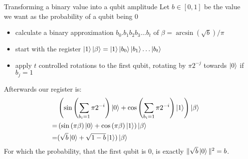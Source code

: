 \documentclass{beamer}
\begin{document}
\frame{\titlepage}










\appendix
\nocite{*}
\frame[allowframebreaks]{\printbibliography}

\begin{frame}{Transforming a binary value into a qubit amplitude}
Let $b\in [0,1]$ be the value we want as the probability of a qubit being 0
\begin{itemize}
\item calculate a binary approximation $b_0.b_1b_2b_3\ldots b_t$ of $\beta=\arcsin(\sqrt{b})/\pi$
\item start with the register $\ket{1}\ket{\beta}=\ket{1}\ket{b_0}\ket{b_1}\ldots\ket{b_t}$
\item apply $t$ controlled rotations to the first qubit, rotating by $\pi 2^{-j}$ towards $\ket{0}$ if $b_j=1$
\end{itemize}
Afterwards our register is: 
\begin{align*}
&\left(\sin\left(\sum_{b_i=1} \pi 2^{-i}\right)\ket{0}
+\cos\left(\sum_{b_i=1} \pi 2^{-i}\right)\ket{1}\right)
 \ket{\beta}\\
=&\left(\sin\left(\pi\beta\right)\ket{0}
+\cos\left(\pi\beta\right)\ket{1}\right)
 \ket{\beta}\\
=&(\sqrt{b}\ket{0}+\sqrt{1-b}\ket{1})\ket{\beta}
\end{align*}
For which the probability, that the first qubit is 0, is exactly $\|\sqrt{b}\ket{0}\|^2=b$.
\end{frame}
\end{document}
